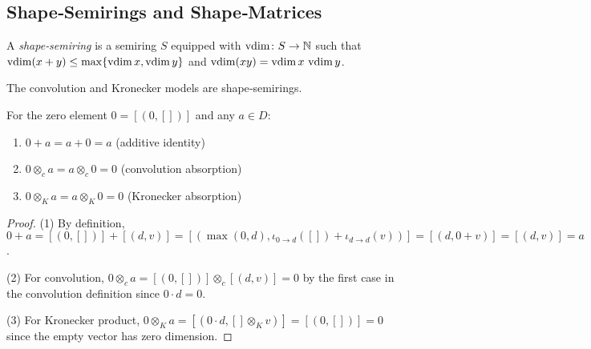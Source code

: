 \label{sec:vsla}
\subsection{Shape‑Semirings and Shape‑Matrices}
\begin{definition}
A \emph{shape‑semiring} is a semiring $S$ equipped with $\operatorname{vdim}\colon S\to\mathbb N$ such that $\operatorname{vdim}(x+y)\le\max\{\operatorname{vdim} x,\operatorname{vdim} y\}$ and $\operatorname{vdim}(xy)=\operatorname{vdim} x\,\operatorname{vdim} y$.
\end{definition}

The convolution and Kronecker models are shape‑semirings.

\begin{lemma}\label{lem:zeroLength}
For the zero element $0 = [(0,[])]$ and any $a \in D$:
\begin{enumerate}[leftmargin=2em]
\item $0 + a = a + 0 = a$ (additive identity)
\item $0 \otimes_c a = a \otimes_c 0 = 0$ (convolution absorption)  
\item $0 \otimes_K a = a \otimes_K 0 = 0$ (Kronecker absorption)
\end{enumerate}
\end{lemma}
\begin{proof}
(1) By definition, $0 + a = [(0,[])] + [(d,v)] = [(\max(0,d), \iota_{0 \to d}([]) + \iota_{d \to d}(v))] = [(d, 0 + v)] = [(d,v)] = a$.

(2) For convolution, $0 \otimes_c a = [(0,[])] \otimes_c [(d,v)] = 0$ by the first case in the convolution definition since $0 \cdot d = 0$.

(3) For Kronecker product, $0 \otimes_K a = [(0 \cdot d, [] \otimes_K v)] = [(0,[])] = 0$ since the empty vector has zero dimension.
\end{proof}

